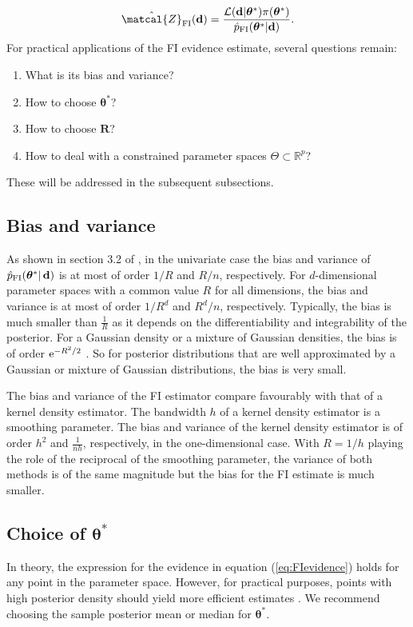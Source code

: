 \documentclass[%
 reprint,
 amsmath,amssymb,
 aps,
]{revtex4-2}
\def\R{\mathbb{R}}
\def\btheta{\boldsymbol{\theta}}
\def\btheta{\boldsymbol{\theta}}
\def\Rbold{\mathbf{R}}
\renewcommand{\d}{{\bf d}}
\newcommand{\btheta}{\mbox{\boldmath $\theta$}}
\newcommand{\e}{{\rm e}}
\begin{document}
\begin{equation}\label{eq:FIevidence}
 \hat{\matcal{Z}}_\text{FI}(\d) = \frac{\mathcal{L}(\d|\btheta^*) 
 \pi(\btheta^*)}{\hat{p}_\text{FI}(\btheta^*|\d)}.
 \end{equation}
For practical applications of the FI evidence estimate, several questions remain:
\begin{enumerate}
     \item What is its bias and variance? 
    \item How to choose $\btheta^*$?
    \item How to choose $\Rbold$?
    \item How to deal with a constrained parameter spaces $\Theta \subset \R^p$?
\end{enumerate}
These will be addressed in the subsequent subsections.


\subsection{\label{subsec:FI bias and variance} Bias and variance}
%
As shown in section 3.2 of \cite{rotiroti2022computing}, in the univariate case the bias and variance of $\hat{p}_\text{FI}(\btheta^*|\,\d)$ is at most of order $1/R$ and  $R/n$, respectively. For $d$-dimensional parameter spaces with a common value $R$ for all dimensions, the bias and variance is at most of order $1/R^d$ and  $R^d/n$, respectively. Typically, the bias is much smaller than $\frac{1}{R}$ as it depends on the differentiability and integrability of the posterior. For a Gaussian density or a mixture of Gaussian densities, the bias is of order $\e^{-R^2/2}$ \cite{rotiroti2022computing}. So for posterior distributions that are well approximated by a Gaussian or mixture of Gaussian distributions, the bias is very small.

The bias and variance of the FI estimator compare favourably with that of a kernel density estimator. The bandwidth $h$ of a kernel density estimator is a smoothing parameter. The bias and variance of the kernel density estimator is of order $h^2$ and $\frac{1}{nh}$, respectively, in the one-dimensional case.  With $R=1/h$ playing the role of the reciprocal of the smoothing parameter, the variance of both methods is of the same magnitude but the bias for the FI estimate is much smaller. 

\subsection{\label{subsec:thetastar} Choice of $\btheta^*$}
In theory, the expression for the evidence in equation (\ref{eq:FIevidence}) holds for any point in the parameter space. However, for practical purposes, points with high posterior density should yield more efficient estimates \cite{chib1995marginal,chib2001marginal}. We recommend choosing the sample posterior mean or median for $\btheta^*$.
\end{document}
